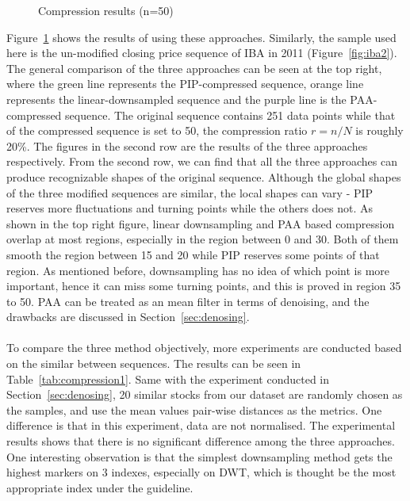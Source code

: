\begin{figure}[!htbp]
    \centering 
    \caption{ Compression results (n=50) } 
    \label{fig:compression2} 
\end{figure} 
Figure~\ref{fig:compression2} shows the results of using these approaches. Similarly, the sample used here is the un-modified closing price sequence of IBA in 2011 (Figure~\ref{fig:iba2}). The general comparison of the three approaches can be seen at the top right, where the green line represents the PIP-compressed sequence, orange line represents the linear-downsampled sequence and the purple line is the PAA-compressed sequence. The original sequence contains 251 data points while that of the compressed sequence is set to 50, the compression ratio $r=n/N$ is roughly 20\%. The figures in the second row are the results of the three approaches respectively. From the second row, we can find that all the three approaches can produce recognizable shapes of the original sequence. Although the global shapes of the three modified sequences are similar, the local shapes can vary - PIP reserves more fluctuations and turning points while the others does not.
As shown in the top right figure, linear downsampling and PAA based compression overlap at most regions, especially in the region between 0 and 30. Both of them smooth the region between 15 and 20 while PIP reserves some points of that region. As mentioned before, downsampling has no idea of which point is more important, hence it can miss some turning points, and this is proved in region 35 to 50. PAA can be treated as an mean filter in terms of denoising, and the drawbacks are discussed in Section~\ref{sec:denosing}. \\
\\To compare the three method objectively, more experiments are conducted based on the similar between sequences. The results can be seen in Table~\ref{tab:compression1}. Same with the experiment conducted in Section~\ref{sec:denosing}, 20 similar stocks from our dataset are randomly chosen as the samples, and use the mean values pair-wise distances as the metrics. One difference is that in this experiment, data are not normalised. The experimental results shows that there is no significant difference among the three approaches. One interesting observation is that the simplest downsampling method gets the highest markers on 3 indexes, especially on DWT, which is thought be the most appropriate index under the guideline. 

